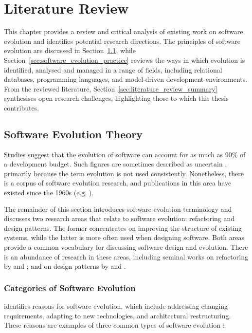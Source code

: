
\chapter{Literature Review}
\label{LiteratureReview}
This chapter provides a review and critical analysis of existing work on software evolution and identifies potential research directions. The principles of software evolution are discussed in Section~\ref{sec:software_evolution_theory}, while Section~\ref{sec:software_evolution_practice} reviews the ways in which evolution is identified, analysed and managed in a range of fields, including relational databases, programming languages, and model-driven development environments. From the reviewed literature, Section~\ref{sec:literature_review_summary} synthesises open research challenges, highlighting those to which this thesis contributes.


\section{Software Evolution Theory}
\label{sec:software_evolution_theory}
Studies \cite{erlikh00leveraging,moad90maintaining} suggest that the evolution of software can account for as much as 90\% of a development budget. Such figures are sometimes described as uncertain \cite[ch. 21]{sommerville06software}, primarily because the term evolution is not used consistently. Nonetheless, there is a corpus of software evolution research, and publications in this area have existed since the 1960s (e.g. \cite{lehman69programming}).

The remainder of this section introduces software evolution terminology and discusses two research areas that relate to software evolution: refactoring and design patterns. The former concentrates on improving the structure of existing systems, while the latter is more often used when designing software. Both areas provide a common vocabulary for discussing software design and evolution. There is an abundance of research in these areas, including seminal works on refactoring by \cite{opdyke92refactoring} and \cite{fowler99refactoring}; and on design patterns by \cite{alexander77pattern} and \cite{gamma95patterns}.

\subsection{Categories of Software Evolution}
\cite{sjoberg93quantifying} identifies reasons for software evolution, which include addressing changing requirements, adapting to new technologies, and architectural restructuring. These reasons are examples of three common types of software evolution \cite[ch. 21]{sommerville06software}:

